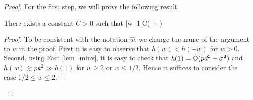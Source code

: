\begin{proof}
For the first step, we will prove the following result.
\begin{claim}\label{lem_hat_v}
There exists a constant $C>0$ such that
	\be\label{hatw_add1}|\hat w -1|\le C\left( + \right)\quad {}\ee
\end{claim}
\begin{proof}
To be consistent with the notation $\hat w$, we change the name of the argument to $w$ in the proof. First it is easy to observe that $h(w)< h(-w)$ for $w> 0$. Second, using Fact \eqref{lem_minv}, it is easy to check that $h(1)=\operatorname{O}(pd^2 + \sigma^2)$ and $ h(w)\gtrsim p\kappa^2 \gg h(1)$ for $w\ge 2$ or $w\le 1/2$.  Hence it suffices to consider the case $1/2\le w\le 2$.


\end{proof}
\end{proof}
